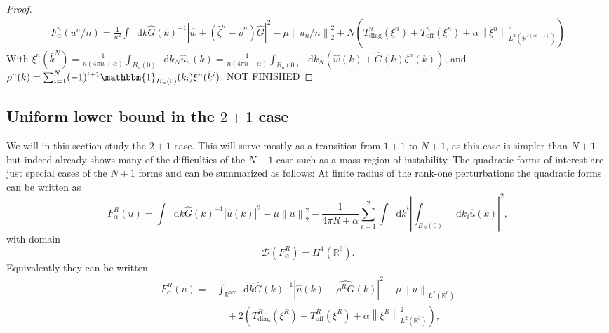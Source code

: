 \documentclass[a4paper,11pt]{article}
\newcommand{\norm}[1]{\left\lVert #1 \right\rVert}
\newcommand{\abs}[1]{\left\lvert #1 \right\rvert}
\newcommand{\dom}[1]{\mathscr D\left(#1\right)}
\newcommand*\diff{\mathop{}\!\mathrm{d}}
\newcommand{\R}{\mathbb{R}}
\numberwithin{equation}{section}
\begin{document}
\begin{proof}
\begin{equation}
	\begin{aligned}
	F_\alpha^n(u^n/n)
	=\frac{1}{n^2}\int\diff k \hat{G}(k)^{-1}\abs{\hat{w}+(\hat{\zeta}^n-\hat{\rho}^n)\hat{G}}^2-\mu\norm{u_n/n}^2_2+N\left(T^n_{\text{diag}}(\xi^n)+T^n_{\text{off}}(\xi^n)+\alpha\norm{\xi^n}^2_{L^2(\R^{3(N-1)})}\right)
	\end{aligned}
	\end{equation}
	With $ \xi^n(\bar{k}^N)=\frac{1}{n(4\pi n+\alpha)}\int_{B_n(0)}\diff k_N\hat{u}_n(k)=\frac{1}{n(4\pi n+\alpha)}\int_{B_n(0)}\diff k_N \left(\hat{w}(k)+\hat{G}(k)\zeta^n(k)\right) $, and\\ $ \rho^n(k)=\sum_{i=1}^{N}(-1)^{i+1}\mathbbm{1}_{B_n(0)}(k_i)\xi^n(\bar{k}^i) $. NOT FINISHED
\end{proof}
\subsection{Uniform lower bound in the $ 2+1 $ case}
We will in this section study the $ 2+1 $ case. This will serve mostly as a transition from $ 1+1 $ to $ N+1 $, as this case is simpler than $ N+1 $ but indeed already shows many of the difficulties of the $ N+1 $ case such as a mass-region of instability. The quadratic forms of interest are just special cases of the $ N+1 $ forms and can be summarized as follows: At finite radius of the rank-one perturbations the quadratic forms can be written as\begin{equation}
F_\alpha^R(u)=\int\diff k \hat{G}(k)^{-1}\abs{\hat{u}(k)}^2-\mu\norm{u}_2^2-\frac{1}{4\pi R+\alpha}\sum_{i=1}^{2}\int\diff\bar{k}^i\left\lvert\int_{B_R(0)}\diff k_i\hat{u}(k)\right\rvert^2,
\end{equation}
with domain \begin{equation}
\dom{F_\alpha^R}=H^1(\R^6).
\end{equation}
Equivalently they can be written
\begin{equation}
\begin{aligned}
F_\alpha^R(u)=&\int_{\R^{3N}}\diff k \hat{G}(k)^{-1}|\hat{u}(k)-\widehat{\rho^R G}(k)|^2-\mu\norm{u}_{L^2(\R^{6})}\\&\quad+2\left(T^R_{\text{diag}}(\xi^R)+T^R_{\text{off}}(\xi^R)+\alpha\norm{\xi^R}_{L^2(\R^{3})}^2\right),
\end{aligned}
\end{equation}
\end{document}
